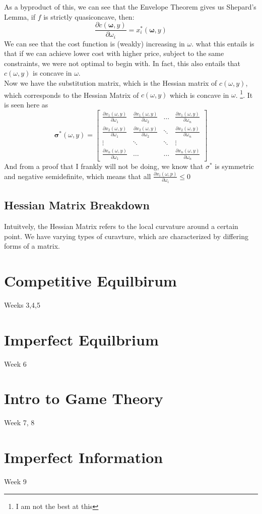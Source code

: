 \documentclass[12pt]{article}
\begin{document}
As a byproduct of this, we can see that the Envelope Theorem gives us Shepard's Lemma, if $f$ is strictly quasiconcave, then:
\[
\frac{\partial c(\mathbf{\omega}, y)}{\partial \omega_i} = x_i^*(\mathbf{\omega}, y)
\]
We can see that the cost function is (weakly) increasing in $\omega$. what this entails is that if we can achieve lower cost with higher price, subject to the same constraints, we were not optimal to begin with. In fact, this also entails that $c(\omega, y)$ is concave in $\omega$. \\
Now we have the substitution matrix, which is the Hessian matrix of $c(\omega, y)$, which corresponds to the Hessian Matrix of $c(\omega, y)$ which is concave in $\omega$. \footnote{I am not the best at this}. It is seen here as 
\[
\mathbf{\sigma^*}(\omega, y) = \begin{bmatrix}
    \frac{\partial x_1(\omega, y)}{\partial \omega_1} & \frac{\partial x_1(\omega, y)}{\partial \omega_2} & \dots & \frac{\partial x_1(\omega, y)}{\partial \omega_n} \\
    \frac{\partial x_2(\omega, y)}{\partial \omega_1} & \frac{\partial x_2(\omega, y)}{\partial \omega_2} & \ddots & \frac{\partial x_2(\omega, y)}{\partial \omega_n}\\
    \vdots & \ddots & \ddots & \vdots \\
    \frac{\partial x_n(\omega, y)}{\partial \omega_1} & \dots & \dots & \frac{\partial x_n(\omega, y)}{\partial \omega_n}
\end{bmatrix}
\]
And from a proof that I frankly will not be doing, we know that $\sigma^*$ is symmetric and negative semidefinite, which means that all $\frac{\partial x_i(\omega, p)}{\partial \omega_i} \leq 0$ 
\subsection{Hessian Matrix Breakdown}
Intuitvely, the Hessian Matrix refers to the local curvature around a certain point. We have varying types of curavture, which are characterized by differing forms of a matrix. 
\section{Competitive Equilbirum}
Weeks 3,4,5
\section{Imperfect Equilbrium}
Week 6
\section{Intro to Game Theory}
Week 7, 8
\section{Imperfect Information}
Week 9
\end{document}
